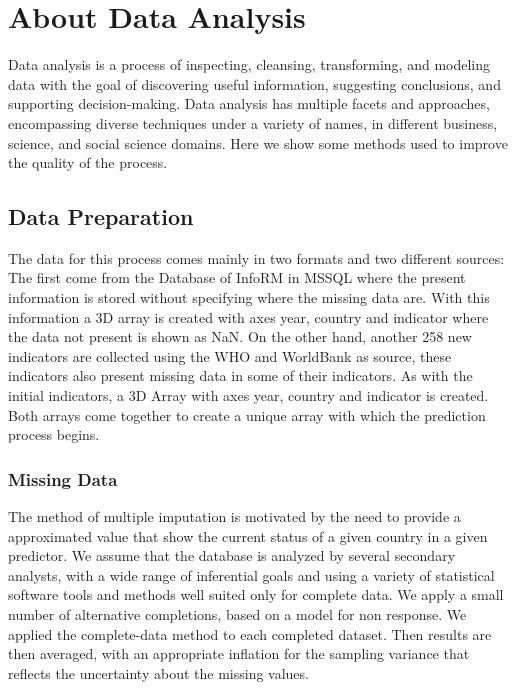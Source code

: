 \documentclass[a4project, twocolumn]{article}
\begin{document}
\newpage
\section{About Data Analysis}

Data analysis  is a process of inspecting, cleansing, transforming, and modeling data with the goal of discovering useful information, suggesting conclusions, and supporting decision-making. Data analysis has multiple facets and approaches, encompassing diverse techniques under a variety of names, in different business, science, and social science domains. Here we show some methods used to improve the quality of the process.

\subsection{Data Preparation}

The data for this process comes mainly in two formats and two different sources: The first come from the Database of InfoRM in MSSQL where the present information is stored without specifying where the missing data are. With this information a 3D array is created with axes year, country and indicator where the data not present is shown as NaN. On the other hand, another 258 new indicators are collected using the WHO and WorldBank as source, these indicators also present missing data in some of their indicators. As with the initial indicators, a 3D Array with axes year, country and indicator is created. Both arrays come together to create a unique array with which the prediction process begins.

\subsubsection{Missing Data}

The method of multiple imputation is motivated by the need to provide a approximated value that show the current status of a given country in a given predictor. We assume that the database is analyzed by several secondary analysts, with a wide range of inferential goals and using a variety of statistical software tools and methods well suited only for complete data. We apply a small number of alternative completions, based on a model for non response. We applied the complete-data method to each completed dataset. Then results are then averaged, with an appropriate inflation for the sampling variance that reflects the uncertainty about the missing values. 
\end{document}
